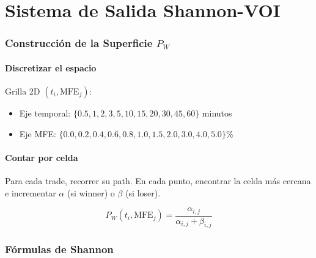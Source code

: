 \documentclass[11pt,a4paper]{article}
\newcommand{\pw}{P_W}
\begin{document}
\newpage
\part{Sistema de Salida Shannon-VOI}

\section{Construcci\'on de la Superficie $\pw$}

\subsection{Discretizar el espacio}

Grilla 2D $(t_i, \text{MFE}_j)$:
\begin{itemize}[leftmargin=1.5em]
\item Eje temporal: $\{0.5, 1, 2, 3, 5, 10, 15, 20, 30, 45, 60\}$ minutos
\item Eje MFE: $\{0.0, 0.2, 0.4, 0.6, 0.8, 1.0, 1.5, 2.0, 3.0, 4.0, 5.0\}$\%
\end{itemize}

\subsection{Contar por celda}

Para cada trade, recorrer su path. En cada punto, encontrar la celda m\'as cercana e incrementar $\alpha$ (si winner) o $\beta$ (si loser).

\begin{tcolorbox}[formula, title=Estimador por celda]
\begin{equation}
\boxed{\pw(t_i, \text{MFE}_j) = \frac{\alpha_{i,j}}{\alpha_{i,j} + \beta_{i,j}}}
\end{equation}
\end{tcolorbox}

\section{F\'ormulas de Shannon}
\end{document}
